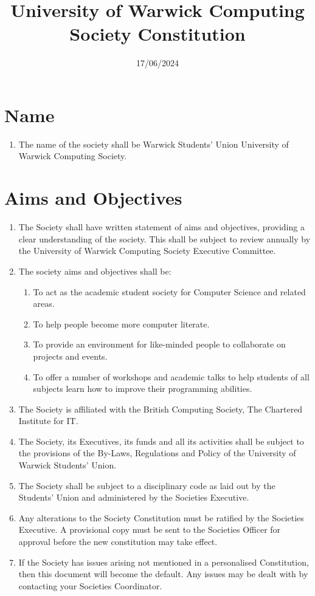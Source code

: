 \documentclass[a4paper,11pt,parskip=half-]{scrartcl} %
\title{University of Warwick Computing Society Constitution}
\date{17/06/2024}
\begin{document}
\maketitle

\section{Name}
\begin{enumerate}
    \item The name of the society shall be Warwick Students' Union University of Warwick Computing Society.
\end{enumerate}

\section{Aims and Objectives}
\begin{enumerate}
    \item The Society shall have written statement of aims and objectives, providing a clear understanding of the society. This shall be subject to review annually by the University of Warwick Computing Society Executive Committee.
    \item The society aims and objectives shall be:
    \begin{enumerate}
        \item To act as the academic student society for Computer Science and related areas.
        \item To help people become more computer literate.
        \item To provide an environment for like-minded people to collaborate on projects and events.
        \item To offer a number of workshops and academic talks to help students of all subjects learn how to improve their programming abilities.
    \end{enumerate}
    \item The Society is affiliated with the British Computing Society, The Chartered Institute for IT.
    \item The Society, its Executives, its funds and all its activities shall be subject to the provisions of the By-Laws, Regulations and Policy of the University of Warwick Students' Union.
    \item The Society shall be subject to a disciplinary code as laid out by the Students' Union and administered by the Societies Executive.
    \item Any alterations to the Society Constitution must be ratified by the Societies Executive. A provisional copy must be sent to the Societies Officer for approval before the new constitution may take effect.
    \item If the Society has issues arising not mentioned in a personalised Constitution, then this document will become the default. Any issues may be dealt with by contacting your Societies Coordinator.
\end{enumerate}
\end{document}
